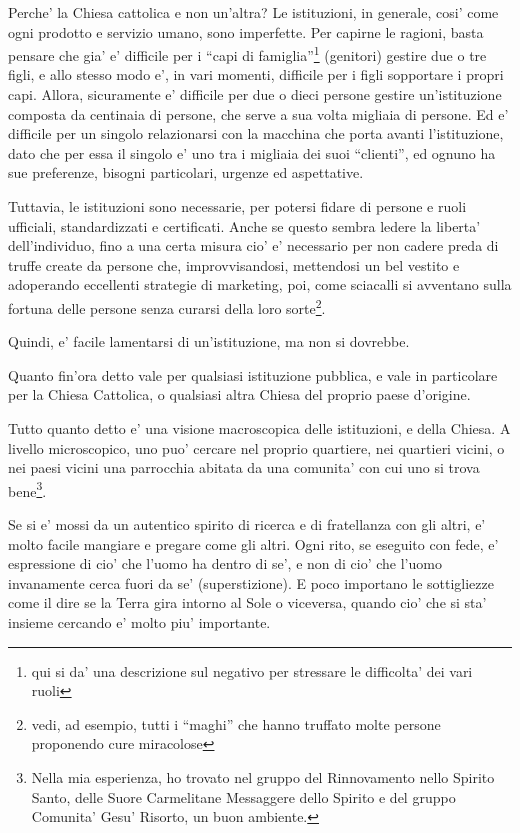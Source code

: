 Perche' la Chiesa cattolica e non un'altra? Le istituzioni, in generale, cosi' come ogni prodotto e servizio umano, sono imperfette. Per capirne le ragioni, basta pensare che gia' e' difficile per i ``capi di famiglia''\footnote{qui si da' una descrizione sul negativo per stressare le difficolta' dei vari ruoli} (genitori) gestire due o tre figli, e allo stesso modo e', in vari momenti, difficile per i figli sopportare i propri capi. Allora, sicuramente e' difficile per due o dieci persone gestire un'istituzione composta da centinaia di persone, che serve a sua volta migliaia di persone. Ed e' difficile per un singolo relazionarsi con la macchina che porta avanti l'istituzione, dato che per essa il singolo e' uno tra i migliaia dei suoi ``clienti'', ed ognuno ha sue preferenze, bisogni particolari, urgenze ed aspettative.

Tuttavia, le istituzioni sono necessarie, per potersi fidare di persone e ruoli ufficiali, standardizzati e certificati. Anche se questo sembra ledere la liberta' dell'individuo, fino a una certa misura cio' e' necessario per non cadere preda di truffe create da persone che, improvvisandosi, mettendosi un bel vestito e adoperando eccellenti strategie di marketing, poi, come sciacalli si avventano sulla fortuna delle persone senza curarsi della loro sorte\footnote{vedi, ad esempio, tutti i ``maghi'' che hanno truffato molte persone proponendo cure miracolose}.

Quindi, e' facile lamentarsi di un'istituzione, ma non si dovrebbe.

Quanto fin'ora detto vale per qualsiasi istituzione pubblica, e vale in particolare per la Chiesa Cattolica, o qualsiasi altra Chiesa del proprio paese d'origine.

Tutto quanto detto e' una visione macroscopica delle istituzioni, e della Chiesa. A livello microscopico, uno puo' cercare nel proprio quartiere, nei quartieri vicini, o nei paesi vicini una parrocchia abitata da una comunita' con cui uno si trova bene\footnote{
Nella mia esperienza, ho trovato nel gruppo del Rinnovamento nello Spirito Santo, delle Suore Carmelitane Messaggere dello Spirito e del gruppo Comunita' Gesu' Risorto, un buon ambiente.
}.

Se si e' mossi da un autentico spirito di ricerca e di fratellanza con gli altri, e' molto facile mangiare e pregare come gli altri. Ogni rito, se eseguito con fede, e' espressione di cio' che l'uomo ha dentro di se', e non di cio' che l'uomo invanamente cerca fuori da se' (superstizione). E poco importano le sottigliezze come il dire se la Terra gira intorno al Sole o viceversa, quando cio' che si sta' insieme cercando e' molto piu' importante.

